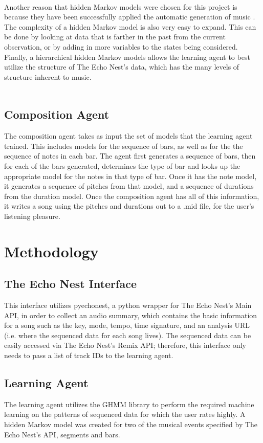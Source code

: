 \documentclass{article}
\begin{document}
\\
Another reason that hidden Markov models were chosen for this project is because they have been successfully applied the automatic generation of music \cite{5492670}. The complexity of a hidden Markov model is also very easy to expand. This can be done by looking at data that is farther in the past from the current observation, or by adding in more variables to the states being considered. Finally, a hierarchical hidden Markov models allows the learning agent to best utilize the structure of The Echo Nest's data, which has the many levels of structure inherent to music.\\
\\

\subsection{Composition Agent}
The composition agent takes as input the set of models that the learning agent trained. This includes models for the sequence of bars, as well as for the the sequence of notes in each bar. The agent first generates a sequence of bars, then for each of the bars generated, determines the type of bar and looks up the appropriate model for the notes in that type of bar. Once it has the note model, it generates a sequence of pitches from that model, and a sequence of durations from the duration model. Once the composition agent has all of this information, it writes a song using the pitches and durations out to a .mid file, for the user’s listening pleasure.

\section{Methodology}
\subsection{The Echo Nest Interface}
This interface utilizes pyechonest, a python wrapper for The Echo Nest's Main API, in order to collect an audio summary, which contains the basic information for a song such as the key, mode, tempo, time signature, and an analysis URL (i.e. where the sequenced data for each song lives). The sequenced data can be easily accessed via The Echo Nest's Remix API; therefore, this interface only needs to pass a list of track IDs to the learning agent.

\subsection{Learning Agent}
The learning agent utilizes the GHMM library to perform the required machine learning on the patterns of sequenced data for which the user rates highly. A hidden Markov model was created for two of the musical events specified by The Echo Nest's API, segments and bars.
\end{document}
